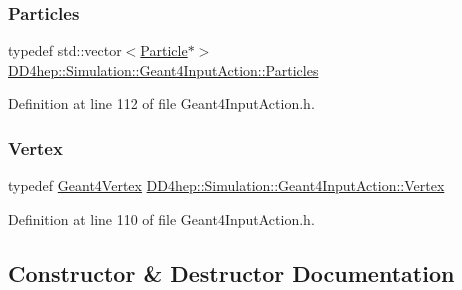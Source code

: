 \hypertarget{class_d_d4hep_1_1_simulation_1_1_geant4_input_action_ae62b1f5e1be390991dd228e7bb7bcc04}{}\label{class_d_d4hep_1_1_simulation_1_1_geant4_input_action_ae62b1f5e1be390991dd228e7bb7bcc04} 
\subsubsection{\texorpdfstring{Particles}{Particles}}
{\footnotesize\ttfamily typedef std\+::vector$<$\hyperlink{class_d_d4hep_1_1_simulation_1_1_geant4_input_action_ab8d227297b50dec5cb769635da56deec}{Particle}$\ast$$>$ \hyperlink{class_d_d4hep_1_1_simulation_1_1_geant4_input_action_ae62b1f5e1be390991dd228e7bb7bcc04}{D\+D4hep\+::\+Simulation\+::\+Geant4\+Input\+Action\+::\+Particles}}



Definition at line 112 of file Geant4\+Input\+Action.\+h.

\hypertarget{class_d_d4hep_1_1_simulation_1_1_geant4_input_action_a0bcc23935dc55574b02d9ee4514eabc8}{}\label{class_d_d4hep_1_1_simulation_1_1_geant4_input_action_a0bcc23935dc55574b02d9ee4514eabc8} 
\subsubsection{\texorpdfstring{Vertex}{Vertex}}
{\footnotesize\ttfamily typedef \hyperlink{class_d_d4hep_1_1_simulation_1_1_geant4_vertex}{Geant4\+Vertex} \hyperlink{class_d_d4hep_1_1_simulation_1_1_geant4_input_action_a0bcc23935dc55574b02d9ee4514eabc8}{D\+D4hep\+::\+Simulation\+::\+Geant4\+Input\+Action\+::\+Vertex}}



Definition at line 110 of file Geant4\+Input\+Action.\+h.



\subsection{Constructor \& Destructor Documentation}
\hypertarget{class_d_d4hep_1_1_simulation_1_1_geant4_input_action_aad1080ace361ad63f71dd53bc7b01580}{}\label{class_d_d4hep_1_1_simulation_1_1_geant4_input_action_aad1080ace361ad63f71dd53bc7b01580} 
